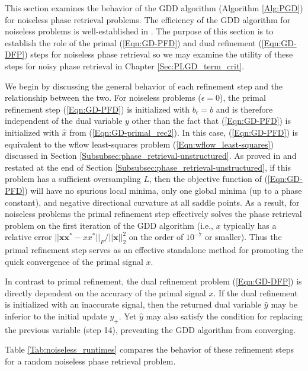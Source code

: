 This section examines the behavior of the GDD algorithm (Algorithm \ref{Alg:PGD}) for noiseless phase retrieval problems.  The efficiency of the GDD algorithm for noiseless problems is well-established in \cite[Sections 5.1.1, 5.1.3]{DBLP:journals/siamsc/FriedlanderM16}.  The purpose of this section is to establish the role of the primal (\ref{Eqn:GD-PFD}) and dual refinement (\ref{Eqn:GD-DFP}) steps for noiseless phase retrieval so we may examine the utility of these steps for noisy phase retrieval in Chapter \ref{Sec:PLGD_term_crit}.

We begin by discussing the general behavior of each refinement step and the relationship between the two.  
For noiseless problems ($\epsilon = 0$), the primal refinement step (\ref{Eqn:GD-PFD}) is initialized with $b_\epsilon = b$ and is therefore independent of the dual variable $y$ other than the fact that (\ref{Eqn:GD-PFD}) is initialized with $\hat{x}$ from (\ref{Eqn:GD-primal_rec2}).  
In this case, (\ref{Eqn:GD-PFD}) is equivalent to the wflow least-squares problem (\ref{Eqn:wflow_least-squares}) discussed in Section \ref{Subsubsec:phase_retrieval-unstructured}.  As proved in \cite{sun2016geometric} and restated at the end of Section \ref{Subsubsec:phase_retrieval-unstructured}, if this problem has a sufficient oversampling $L$, then the objective function of (\ref{Eqn:GD-PFD}) will have no spurious local minima, only one global minima (up to a phase constant), and negative directional curvature at all saddle points.  As a result, for noiseless problems the primal refinement step effectively solves the phase retrieval problem on the first iteration of the GDD algorithm (i.e., $x$ typically has a relative error $|| \mathbf{x}\mathbf{x}^* - xx^* ||_F / ||\mathbf{x}||_2^2$ on the order of $10^{-7}$ or smaller).  Thus the primal refinement step serves as an effective standalone method for promoting the quick convergence of the primal signal $x$.

In contrast to primal refinement, the dual refinement problem (\ref{Eqn:GD-DFP}) is directly dependent on the accuracy of the primal signal $x$.  If the dual refinement is initialized with an inaccurate signal, then the returned dual variable $\hat{y}$ may be inferior to the initial update $y_+$.  Yet $\hat{y}$ may also satisfy the condition for replacing the previous variable (step 14), preventing the GDD algorithm from converging.

Table \ref{Tab:noiseless_runtimes} compares the behavior of these refinement steps for a random noiseless phase retrieval problem.

